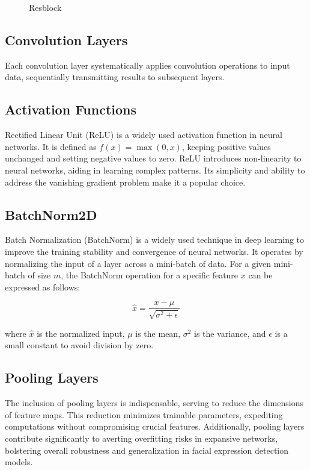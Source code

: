 \documentclass[]{report}
\begin{document}
\begin{figure}[h]
	\centering
	
	\caption{Resblock}
	\label{fig:resblock}
\end{figure}

\subsection{Convolution Layers}
Each convolution layer systematically applies convolution operations to input data, sequentially transmitting results to subsequent layers.

\subsection{Activation Functions}
Rectified Linear Unit (ReLU) is a widely used activation function in neural networks. It is defined as $f(x) = \max(0, x)$, keeping positive values unchanged and setting negative values to zero. ReLU introduces non-linearity to neural networks, aiding in learning complex patterns. Its simplicity and ability to address the vanishing gradient problem make it a popular choice.

\subsection{BatchNorm2D}
Batch Normalization (BatchNorm) is a widely used technique in deep learning to improve the training stability and convergence of neural networks. It operates by normalizing the input of a layer across a mini-batch of data. For a given mini-batch of size \(m\), the BatchNorm operation for a specific feature \(x\) can be expressed as follows:

\begin{equation}
    \hat{x} = \frac{x - \mu}{\sqrt{\sigma^2 + \epsilon}}
\end{equation}

where \(\hat{x}\) is the normalized input, \(\mu\) is the mean, \(\sigma^2\) is the variance, and \(\epsilon\) is a small constant to avoid division by zero.


\subsection{Pooling Layers}
The inclusion of pooling layers is indispensable, serving to reduce the dimensions of feature maps. This reduction minimizes trainable parameters, expediting computations without compromising crucial features. Additionally, pooling layers contribute significantly to averting overfitting risks in expansive networks, bolstering overall robustness and generalization in facial expression detection models.
\end{document}
